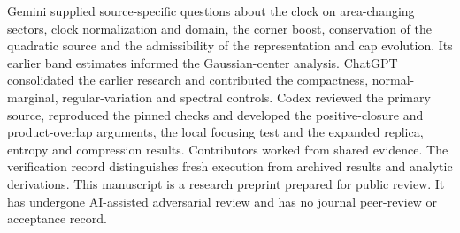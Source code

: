 \documentclass[11pt]{article}
\begin{document}
Gemini supplied source-specific questions about the clock on area-changing sectors, clock normalization and domain, the corner boost, conservation of the quadratic source and the admissibility of the representation and cap evolution. Its earlier band estimates informed the Gaussian-center analysis. ChatGPT consolidated the earlier research and contributed the compactness, normal-marginal, regular-variation and spectral controls. Codex reviewed the primary source, reproduced the pinned checks and developed the positive-closure and product-overlap arguments, the local focusing test and the expanded replica, entropy and compression results. Contributors worked from shared evidence. The verification record distinguishes fresh execution from archived results and analytic derivations. This manuscript is a research preprint prepared for public review. It has undergone AI-assisted adversarial review and has no journal peer-review or acceptance record.
\end{document}
